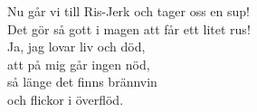 \vspace{10pt}
Nu går vi till Ris-Jerk och tager oss en sup!\\
Det gör så gott i magen att får ett litet rus!\\
\revrpt Ja, jag lovar liv och död,\\
att på mig går ingen nöd,\\
så länge det finns brännvin\\
och flickor i överflöd.\rpt
